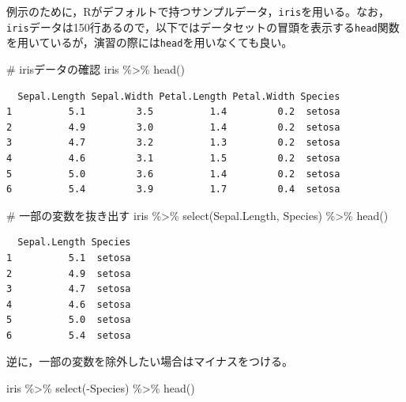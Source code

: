 \documentclass[
  a4paper,
]{ltjsbook}
\newenvironment{Shaded}{\begin{snugshade}}{\end{snugshade}}
\newcommand{\CommentTok}[1]{\textcolor[rgb]{0.37,0.37,0.37}{#1}}
\newcommand{\FunctionTok}[1]{\textcolor[rgb]{0.28,0.35,0.67}{#1}}
\newcommand{\NormalTok}[1]{\textcolor[rgb]{0.00,0.23,0.31}{#1}}
\newcommand{\SpecialCharTok}[1]{\textcolor[rgb]{0.37,0.37,0.37}{#1}}
\begin{document}
例示のために，Rがデフォルトで持つサンプルデータ，\texttt{iris}を用いる。なお，\texttt{iris}データは150行あるので，以下ではデータセットの冒頭を表示する\texttt{head}関数を用いているが，演習の際には\texttt{head}を用いなくても良い。

\begin{Shaded}
\begin{Highlighting}[]
\CommentTok{\# irisデータの確認}
\NormalTok{iris }\SpecialCharTok{\%\textgreater{}\%} \FunctionTok{head}\NormalTok{()}
\end{Highlighting}
\end{Shaded}

\begin{verbatim}
  Sepal.Length Sepal.Width Petal.Length Petal.Width Species
1          5.1         3.5          1.4         0.2  setosa
2          4.9         3.0          1.4         0.2  setosa
3          4.7         3.2          1.3         0.2  setosa
4          4.6         3.1          1.5         0.2  setosa
5          5.0         3.6          1.4         0.2  setosa
6          5.4         3.9          1.7         0.4  setosa
\end{verbatim}

\begin{Shaded}
\begin{Highlighting}[]
\CommentTok{\# 一部の変数を抜き出す}
\NormalTok{iris }\SpecialCharTok{\%\textgreater{}\%}
  \FunctionTok{select}\NormalTok{(Sepal.Length, Species) }\SpecialCharTok{\%\textgreater{}\%}
  \FunctionTok{head}\NormalTok{()}
\end{Highlighting}
\end{Shaded}

\begin{verbatim}
  Sepal.Length Species
1          5.1  setosa
2          4.9  setosa
3          4.7  setosa
4          4.6  setosa
5          5.0  setosa
6          5.4  setosa
\end{verbatim}

逆に，一部の変数を除外したい場合はマイナスをつける。

\begin{Shaded}
\begin{Highlighting}[]
\NormalTok{iris }\SpecialCharTok{\%\textgreater{}\%}
  \FunctionTok{select}\NormalTok{(}\SpecialCharTok{{-}}\NormalTok{Species) }\SpecialCharTok{\%\textgreater{}\%}
  \FunctionTok{head}\NormalTok{()}
\end{Highlighting}
\end{Shaded}
\end{document}
